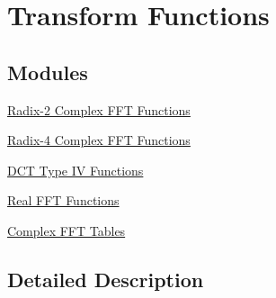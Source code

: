 \hypertarget{group__group_transforms}{\section{Transform Functions}
\label{group__group_transforms}
}
\subsection*{Modules}
\begin{DoxyCompactItemize}
\item 
\hyperlink{group___radix2___c_f_f_t___c_i_f_f_t}{Radix-\/2 Complex F\-F\-T Functions}
\item 
\hyperlink{group___radix4___c_f_f_t___c_i_f_f_t}{Radix-\/4 Complex F\-F\-T Functions}
\item 
\hyperlink{group___d_c_t4___i_d_c_t4}{D\-C\-T Type I\-V Functions}
\item 
\hyperlink{group___r_f_f_t___r_i_f_f_t}{Real F\-F\-T Functions}
\item 
\hyperlink{group___c_f_f_t___c_i_f_f_t}{Complex F\-F\-T Tables}
\end{DoxyCompactItemize}


\subsection{Detailed Description}
